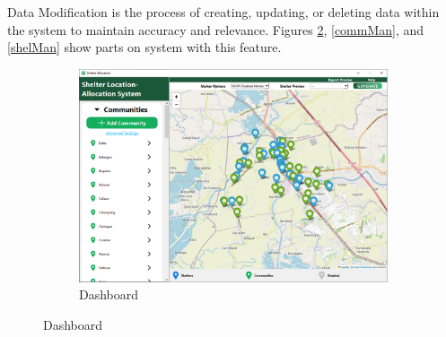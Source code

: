 \documentclass[11pt,letterpaper,]{article}
\begin{document}
	Data Modification is the process of creating, updating, or deleting data within the system to maintain accuracy and relevance. Figures \ref{db}, \ref{commMan}, and \ref{shelMan} show parts on system with this feature.
	
	\begin{figure}[H]
		\centering
		\caption{Data Modification UI}
		
		\begin{subfigure}{0.4\textwidth}
			\caption{Dashboard}
			\label{db}
			\centering
			\includegraphics[width=\linewidth]{Chapter 4/dashboard}
		\end{subfigure}
		

\end{figure}
\end{document}
